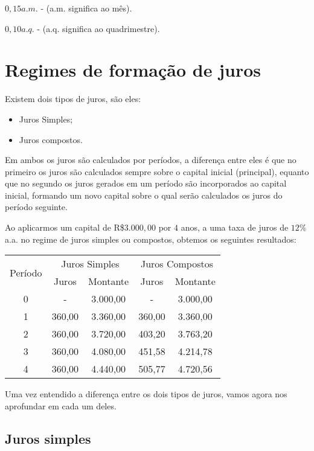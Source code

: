  $0,15 a.m.$ - (a.m. significa ao mês).
 
 $0,10 a.q.$ - (a.q. significa ao quadrimestre).
 
 \newpage

 \section{Regimes de formação de juros}
 
 Existem dois tipos de juros, são eles:
 \begin{itemize}
  \item Juros Simples;
  \item Juros compostos.
 \end{itemize}
 Em ambos os juros são calculados por períodos, a diferença entre eles é que no primeiro os juros são calculados sempre sobre o capital inicial (principal), equanto que no segundo os juros gerados em um período são incorporados ao capital inicial, formando um novo capital sobre o qual serão calculados os juros do período seguinte.
 
 \begin{exem}
  Ao aplicarmos um capital de R\$$3.000,00$ por $4$ anos, a uma taxa de juros de $12\%$ a.a. no regime de juros simples ou compostos, obtemos os seguintes resultados:
\begin{table}[h]
\centering
\label{my-label}
\begin{tabular}{|c|c|c|c|c|} \hline
\multirow{2}{*}{Período} & \multicolumn{2}{|c|}{Juros Simples} & \multicolumn{2}{|c|}{Juros Compostos} \\
    & Juros  & Montante & Juros  & Montante \\\hline
  0 & -      & 3.000,00 & -      & 3.000,00 \\\hline
  1 & 360,00 & 3.360,00 & 360,00 & 3.360,00 \\\hline
  2 & 360,00 & 3.720,00 & 403,20 & 3.763,20 \\\hline
  3 & 360,00 & 4.080,00 & 451,58 & 4.214,78 \\\hline
  4 & 360,00 & 4.440,00 & 505,77 & 4.720,56 \\\hline
\end{tabular}
\end{table}
 \end{exem}
 
 Uma vez entendido a diferença entre os dois tipos de juros, vamos agora nos aprofundar em cada um deles.
 
 \subsection{Juros simples}
 
